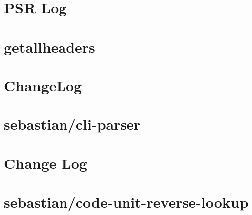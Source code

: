\documentclass[twoside]{book}
\newcommand{\+}{\discretionary{\mbox{\scriptsize$\hookleftarrow$}}{}{}}
\begin{document}
\chapter{PSR Log}
\label{md__c__workspace__proyecto__p_h_p_project_vendor_psr_log__r_e_a_d_m_e}

\chapter{getallheaders}
\label{md__c__workspace__proyecto__p_h_p_project_vendor_ralouphie_getallheaders__r_e_a_d_m_e}

\chapter{Change\+Log}
\label{md__c__workspace__proyecto__p_h_p_project_vendor_sebastian_cli_parser__change_log}

\chapter{sebastian/cli-\/parser}
\label{md__c__workspace__proyecto__p_h_p_project_vendor_sebastian_cli_parser__r_e_a_d_m_e}

\chapter{Change Log}
\label{md__c__workspace__proyecto__p_h_p_project_vendor_sebastian_code_unit_reverse_lookup__change_log}

\chapter{sebastian/code-\/unit-\/reverse-\/lookup}
\label{md__c__workspace__proyecto__p_h_p_project_vendor_sebastian_code_unit_reverse_lookup__r_e_a_d_m_e}

\end{document}
